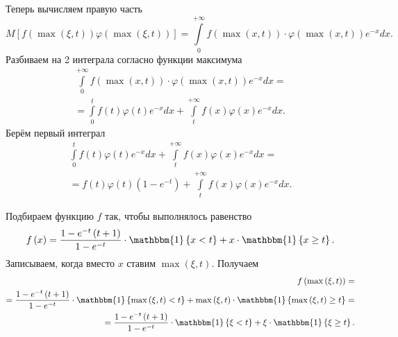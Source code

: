 \begin{enumerate}[label=\alph*)]
  Теперь вычисляем правую часть
  $$M \left[
      f \left( \max \left( \xi, t \right) \right) \varphi \left( \max \left( \xi, t \right) \right)
    \right] =
    \int \limits_0^{+ \infty }
      f \left( \max \left( x, t \right) \right) \cdot
      \varphi \left( \max \left( x, t \right) \right) e^{-x}
    dx.$$
  Разбиваем на 2 интеграла согласно функции максимума
  \begin{equation*}
    \begin{split}
      \int \limits_0^{+ \infty }
        f \left( \max \left( x, t \right) \right) \cdot
        \varphi \left( \max \left( x, t \right) \right) e^{-x}
      dx = \\
      = \int \limits_0^t f \left( t \right) \varphi \left( t \right) e^{-x} dx +
      \int \limits_t^{+ \infty } f \left( x \right) \varphi \left( x \right) e^{-x} dx.
    \end{split}
  \end{equation*}
  Берём первый интеграл
  \begin{equation*}
    \begin{split}
      \int \limits_0^t f \left( t \right) \varphi \left( t \right) e^{-x} dx +
      \int \limits_t^{+ \infty } f \left( x \right) \varphi \left( x \right) e^{-x} dx = \\
      = f \left( t \right) \varphi \left( t \right) \left( 1 - e^{-t} \right) +
      \int \limits_t^{+ \infty } f \left( x \right) \varphi \left( x \right) e^{-x} dx.
    \end{split}
  \end{equation*}

  Подбираем функцию $f$ так, чтобы выполнялось равенство
  $$f \left( x \right) =
    \frac{1 - e^{-t} \left( t + 1 \right) }{1 - e^{-t}} \cdot \mathbbm{1} \left\{ x < t \right\} +
    x \cdot \mathbbm{1} \left\{ x \geq t \right\}.$$
  Записываем, когда вместо $x$ ставим $ \max \left( \xi, t \right) $.
  Получаем
  \begin{equation*}
    \begin{split}
      f \left( \max \left( \xi, t \right) \right) = \\
      = \frac{1 - e^{-t} \left( t + 1 \right) }{1 - e^{-t}} \cdot
      \mathbbm{1} \left\{ \max \left( \xi, t \right) < t \right\} +
      \max \left( \xi, t \right) \cdot
      \mathbbm{1} \left\{ \max \left( \xi, t \right) \geq t \right\} = \\
      = \frac{1 - e^{-t} \left( t + 1 \right) }{1 - e^{-t}} \cdot
      \mathbbm{1} \left\{ \xi < t \right\} +
      \xi \cdot \mathbbm{1} \left\{ \xi \geq t \right\}.
    \end{split}
  \end{equation*}
\end{enumerate}

